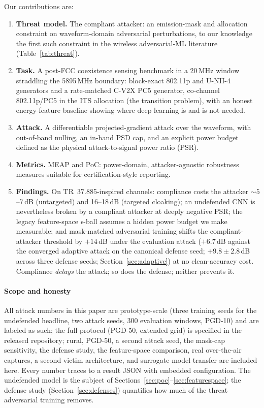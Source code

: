 \documentclass[review]{elsarticle}
\begin{document}
Our contributions are:
\begin{enumerate}
  \item \textbf{Threat model.} The compliant attacker: an emission-mask and
  allocation constraint on waveform-domain adversarial perturbations, to our
  knowledge the first such constraint in the wireless adversarial-ML
  literature (Table~\ref{tab:threat}).
  \item \textbf{Task.} A post-FCC coexistence sensing benchmark in a
  20\,MHz window straddling the 5895\,MHz boundary: block-exact 802.11p and
  U-NII-4 generators and a rate-matched C-V2X PC5 generator, co-channel
  802.11p/PC5 in the ITS allocation (the transition problem), with an
  honest energy-feature baseline showing where deep learning is and is not
  needed.
  \item \textbf{Attack.} A differentiable projected-gradient attack over the
  waveform, with out-of-band nulling, an in-band PSD cap, and an explicit
  power budget defined as the physical attack-to-signal power ratio (PSR).
  \item \textbf{Metrics.} MEAP and PoC: power-domain, attacker-agnostic
  robustness measures suitable for certification-style reporting.
  \item \textbf{Findings.} On TR~37.885-inspired channels: compliance costs
  the attacker ${\sim}5$--7\,dB (untargeted) and 16--18\,dB (targeted
  cloaking); an undefended CNN is nevertheless broken by a compliant attacker
  at deeply negative PSR; the legacy feature-space $\epsilon$-ball assumes a
  hidden power budget we make measurable; and mask-matched adversarial
  training shifts the compliant-attacker threshold by $+14$\,dB under the
  evaluation attack ($+6.7$\,dB against the converged adaptive attack on the
  canonical defense seed; $+9.8\pm2.8$\,dB across three defense seeds;
  Section~\ref{sec:adaptive}) at no
  clean-accuracy cost. Compliance \emph{delays} the attack; so does the
  defense; neither prevents it.
\end{enumerate}

\paragraph{Scope and honesty} All attack numbers in this paper are
prototype-scale (three training seeds for the undefended headline, two
attack seeds, 300 evaluation windows, PGD-10) and are labeled as such; the
full protocol (PGD-50, extended grid) is specified in the released
repository; rural, PGD-50, a second attack seed, the mask-cap sensitivity,
the defense study, the feature-space comparison, real over-the-air
captures, a second victim architecture, and surrogate-model transfer are
included here. Every number traces to a result JSON with embedded
configuration. The undefended model is
the subject of Sections~\ref{sec:poc}--\ref{sec:featurespace}; the defense
study (Section~\ref{sec:defenses}) quantifies how much of the threat
adversarial training removes.
\end{document}

